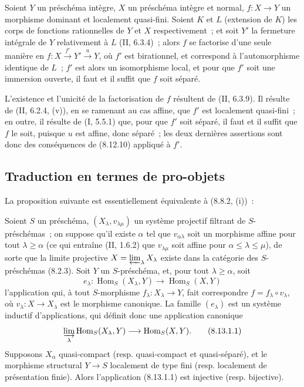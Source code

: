 \begin{corollary}[8.12.11]
Soient $Y$ un préschéma intègre, $X$ un préschéma intègre et normal,
$f:X\to Y$ un morphisme dominant et localement quasi-fini. Soient $K$ et
$L$ (extension de $K$) les corps de fonctions rationnelles de $Y$ et $X$
respectivement~; et soit $Y'$ la fermeture intégrale de $Y$ relativement à
$L$ (II, 6.3.4)~; alors $f$ se factorise d'une seule manière en
$f:X\xrightarrow{f'}Y'\xrightarrow{u}Y$, où $f'$ est birationnel, et
correspond à l'automorphisme identique de $L$~; $f'$ est alors un
isomorphisme local, et pour que $f'$ soit une immersion ouverte, il faut et
il suffit que $f$ soit séparé.
\end{corollary}

L'existence et l'unicité de la factorisation de $f$ résultent de (II, 6.3.9).
Il résulte de (II, 6.2.4, (v)), en se ramenant au cas affine, que $f'$ est
localement quasi-fini~; en outre, il résulte de (I, 5.5.1) que, pour que
$f'$ soit séparé, il faut et il suffit que $f$ le soit, puisque $u$ est
affine, donc séparé~; les deux dernières assertions sont donc des
conséquences de (8.12.10) appliqué à $f'$.

\subsection{Traduction en termes de pro-objets}
\label{subsection:IV.8.13-fr}

La proposition suivante est essentiellement équivalente à (8.8.2, (i))~:

\begin{proposition}[8.13.1]
\label{IV.8.13.1-fr}
Soient $S$ un préschéma, $(X_\lambda,v_{\lambda\mu})$ un système projectif
filtrant de $S$-préschémas~; on suppose qu'il existe $\alpha$ tel que
$v_{\alpha\lambda}$ soit un morphisme affine pour tout $\lambda\geqslant
\alpha$ (ce qui entraîne (II, 1.6.2) que $v_{\lambda\mu}$ soit affine pour
$\alpha\leqslant\lambda\leqslant\mu$), de sorte que la limite projective
$X=\varprojlim_\lambda X_\lambda$ existe dans la catégorie des $S$-préschémas
(8.2.3). Soit $Y$ un $S$-préschéma, et, pour tout $\lambda\geqslant\alpha$,
soit
\[
e_\lambda:\operatorname{Hom}_S(X_\lambda,Y)
\longrightarrow\operatorname{Hom}_S(X,Y)
\]
l'application qui, à tout $S$-morphisme $f_\lambda:X_\lambda\to Y$, fait
correspondre $f=f_\lambda\circ v_\lambda$, où $v_\lambda:X\to X_\lambda$
est le morphisme canonique. La famille $(e_\lambda)$ est un système inductif
d'applications, qui définit donc une application canonique
\begin{equation}
\label{IV.8.13.1.1-fr}
\varinjlim_\lambda\operatorname{Hom}_S(X_\lambda,Y)
\longrightarrow\operatorname{Hom}_S(X,Y). \tag{8.13.1.1}
\end{equation}
Supposons $X_\alpha$ quasi-compact (resp. quasi-compact et quasi-séparé), et le
morphisme structural $Y\to S$ localement de type fini (resp. localement de
présentation finie). Alors l'application (8.13.1.1) est injective (resp.
bijective).
\end{proposition}

